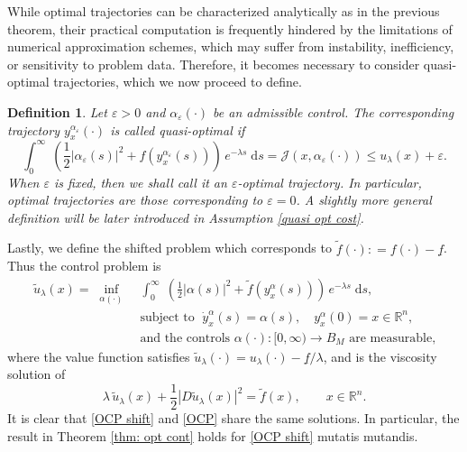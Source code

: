 \documentclass[12pt]{amsart}
\numberwithin{equation}{section}
\theoremstyle{plain}
\newtheorem{definition}[theorem]{Definition}
\begin{document}
While optimal trajectories can be characterized analytically as in the previous theorem, their practical computation is frequently hindered by the limitations of numerical approximation schemes, which may suffer from instability, inefficiency, or sensitivity to problem data. Therefore, it becomes necessary to consider quasi-optimal trajectories, which we now proceed to define.

\begin{definition}\label{def: quasi}
Let $\varepsilon>0$ %
and $\alpha_{\varepsilon}(\cdot)$ be an admissible control. The corresponding trajectory $y_{x}^{\alpha_{\varepsilon}}(\cdot)$ is called quasi-optimal if 
\begin{equation*}
     \int_{0}^{\infty}\; \left(\frac{1}{2}|\alpha_{\varepsilon}(s)|^{2} + f(y_{x}^{\alpha_{\varepsilon}}(s))\right)\, e^{-\lambda s}\;\text{d}s = \mathscr{J}(x,\alpha_{\varepsilon}(\cdot)) \leq u_{\lambda}(x)+ \varepsilon.
\end{equation*}
When $\varepsilon$ is fixed, then we shall call it an $\varepsilon$-optimal trajectory. In particular, 
optimal trajectories are those corresponding to $\varepsilon=0$. A slightly more general definition will be later introduced in Assumption \ref{quasi opt cost}.
\end{definition}



Lastly, we define the shifted problem which corresponds to $\tilde{f}(\cdot) : = f(\cdot) - \underline{f}$. Thus the control problem is
\begin{equation}\label{OCP shift}
\begin{aligned}
    \tilde{u}_{\lambda}(x) = \; 
    \inf\limits_{\alpha(\cdot)} \; & \int_{0}^{\infty}\; \left(\frac{1}{2}|\alpha(s)|^{2} + \tilde{f}(y_{x}^{\alpha}(s))\right)\, e^{-\lambda s}\;\text{d}s,\\
    & \text{subject  to  }\; \dot{y}_{x}^{\alpha}(s) = \alpha(s),\quad y_{x}^{\alpha}(0)=x\in\mathbb{R}^n,\\
    & \text{and the controls } \alpha(\cdot):[0,\infty) \to B_{M} \text{ are measurable,} 
\end{aligned}
\end{equation}
where the value function satisfies $\tilde{u}_{\lambda}(\cdot) = u_{\lambda}(\cdot) - \underline{f}/\lambda$, and is the viscosity solution of 
\begin{equation}\label{eq: HJB lambda shift}
    \lambda\, \tilde{u}_{\lambda}(x) + \frac{1}{2}|D\tilde{u}_{\lambda}(x)|^{2} = \tilde{f}(x), \quad \quad x\in\mathbb{R}^{n}.
\end{equation}
It is clear that \eqref{OCP shift} and \eqref{OCP} share the same solutions. 
In particular, the result in Theorem \ref{thm: opt cont} holds for \eqref{OCP shift} mutatis mutandis. 
\end{document}
